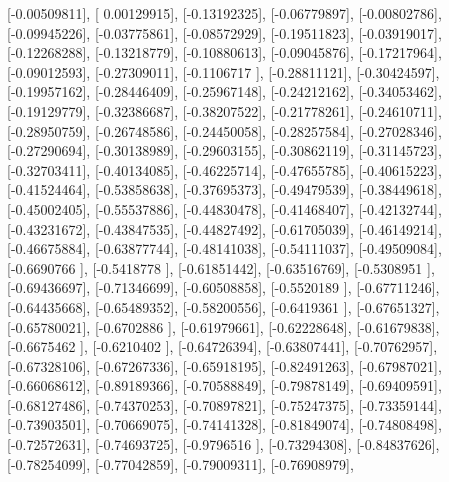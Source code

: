 \documentclass{article}
\begin{document}
       [-0.00509811],
       [ 0.00129915],
       [-0.13192325],
       [-0.06779897],
       [-0.00802786],
       [-0.09945226],
       [-0.03775861],
       [-0.08572929],
       [-0.19511823],
       [-0.03919017],
       [-0.12268288],
       [-0.13218779],
       [-0.10880613],
       [-0.09045876],
       [-0.17217964],
       [-0.09012593],
       [-0.27309011],
       [-0.1106717 ],
       [-0.28811121],
       [-0.30424597],
       [-0.19957162],
       [-0.28446409],
       [-0.25967148],
       [-0.24212162],
       [-0.34053462],
       [-0.19129779],
       [-0.32386687],
       [-0.38207522],
       [-0.21778261],
       [-0.24610711],
       [-0.28950759],
       [-0.26748586],
       [-0.24450058],
       [-0.28257584],
       [-0.27028346],
       [-0.27290694],
       [-0.30138989],
       [-0.29603155],
       [-0.30862119],
       [-0.31145723],
       [-0.32703411],
       [-0.40134085],
       [-0.46225714],
       [-0.47655785],
       [-0.40615223],
       [-0.41524464],
       [-0.53858638],
       [-0.37695373],
       [-0.49479539],
       [-0.38449618],
       [-0.45002405],
       [-0.55537886],
       [-0.44830478],
       [-0.41468407],
       [-0.42132744],
       [-0.43231672],
       [-0.43847535],
       [-0.44827492],
       [-0.61705039],
       [-0.46149214],
       [-0.46675884],
       [-0.63877744],
       [-0.48141038],
       [-0.54111037],
       [-0.49509084],
       [-0.6690766 ],
       [-0.5418778 ],
       [-0.61851442],
       [-0.63516769],
       [-0.5308951 ],
       [-0.69436697],
       [-0.71346699],
       [-0.60508858],
       [-0.5520189 ],
       [-0.67711246],
       [-0.64435668],
       [-0.65489352],
       [-0.58200556],
       [-0.6419361 ],
       [-0.67651327],
       [-0.65780021],
       [-0.6702886 ],
       [-0.61979661],
       [-0.62228648],
       [-0.61679838],
       [-0.6675462 ],
       [-0.6210402 ],
       [-0.64726394],
       [-0.63807441],
       [-0.70762957],
       [-0.67328106],
       [-0.67267336],
       [-0.65918195],
       [-0.82491263],
       [-0.67987021],
       [-0.66068612],
       [-0.89189366],
       [-0.70588849],
       [-0.79878149],
       [-0.69409591],
       [-0.68127486],
       [-0.74370253],
       [-0.70897821],
       [-0.75247375],
       [-0.73359144],
       [-0.73903501],
       [-0.70669075],
       [-0.74141328],
       [-0.81849074],
       [-0.74808498],
       [-0.72572631],
       [-0.74693725],
       [-0.9796516 ],
       [-0.73294308],
       [-0.84837626],
       [-0.78254099],
       [-0.77042859],
       [-0.79009311],
       [-0.76908979],
\end{document}
